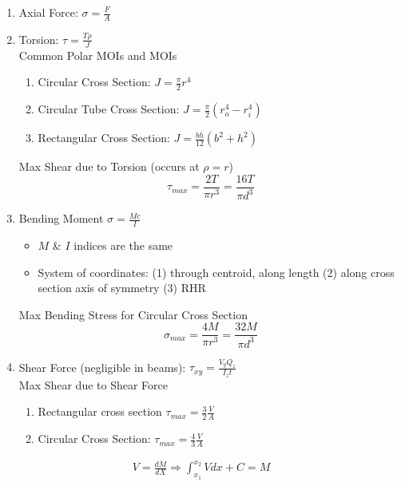 
\vspace{-5pt}
\begin{enumerate}
    \item Axial Force: $\sigma = \displaystyle\frac{F}{A}$
    \item Torsion: $\tau = \displaystyle\frac{T\rho}{J}$\\
    Common Polar MOIs and MOIs
    \begin{enumerate}
        \item Circular Cross Section: $J=\frac{\pi}{2}r^4$ \,%
        \item Circular Tube Cross Section: $J=\frac{\pi}{2}(r_o^4-r_i^4)$ 
        \item Rectangular Cross Section: $J = \frac{bh}{12}(b^2+h^2)$ \,%
    \end{enumerate}
    Max Shear due to Torsion (occurs at $\rho=r$)
    \begin{equation*}
        \tau_{max}=\frac{2T}{\pi r^3}=\frac{16T}{\pi d^3}
    \end{equation*}
    \item Bending Moment $\sigma = \displaystyle\frac{Mc}{I}$
    \begin{itemize}
        \item $M$ \& $I$ indices are the same
        \item System of coordinates: (1) through centroid, along length (2) along cross section axis of symmetry (3) RHR
    \end{itemize}
    Max Bending Stress for Circular Cross Section
    \begin{equation*}
        \sigma_{max}=\frac{4M}{\pi r^3}=\frac{32 M}{\pi d^3}
    \end{equation*}
    \item Shear Force (negligible in beams): $        \tau_{xy} = \displaystyle \frac{V_yQ_z}{I_z t}$\\
    Max Shear due to Shear Force
    \begin{enumerate}
        \item Rectangular cross section $\tau_{max} =\frac{3}{2}\frac{V}{A}$
        \item Circular Cross Section: $\tau_{max} = \frac{4}{3}\frac{V}{A}$
    \end{enumerate}
\end{enumerate}
\begin{align*}
    V=\frac{dM}{dX}\Longrightarrow \int_{x_1}^{x_2} V  dx + C = M
\end{align*}
